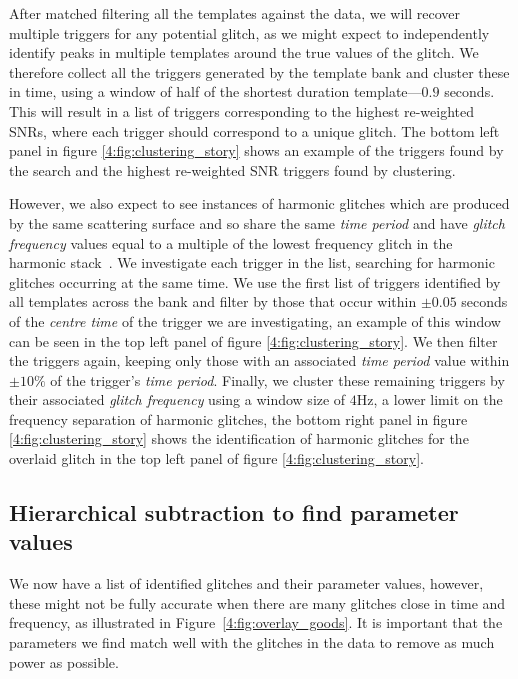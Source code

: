 After matched filtering all the templates against the data, we will recover multiple triggers for any potential \scladj glitch, as we might expect to independently identify peaks in multiple templates around the true values of the glitch. We therefore collect all the triggers generated by the template bank and cluster these in time, using a window of half of the shortest duration template---$0.9$ seconds. This will result in a list of triggers corresponding to the highest re-weighted SNRs, where each trigger should correspond to a unique \scladj glitch. The bottom left panel in figure \ref{4:fig:clustering_story} shows an example of the triggers found by the search and the highest re-weighted SNR triggers found by clustering.

However, we also expect to see instances of harmonic glitches which are produced by the same scattering surface and so share the same \emph{time period} and have \emph{glitch frequency} values equal to a multiple of the lowest frequency glitch in the harmonic stack~\cite{TAccadia:2010}. We investigate each trigger in the list, searching for harmonic glitches occurring at the same time. We use the first list of triggers identified by all templates across the bank and filter by those that occur within $\pm0.05$ seconds of the \emph{centre time} of the trigger we are investigating, an example of this window can be seen in the top left panel of figure \ref{4:fig:clustering_story}. We then filter the triggers again, keeping only those with an associated \emph{time period} value within $\pm 10 \%$ of the trigger's \emph{time period}. Finally, we cluster these remaining triggers by their associated \emph{glitch frequency} using a window size of $4$Hz, a lower limit on the frequency separation of harmonic glitches, the bottom right panel in figure \ref{4:fig:clustering_story} shows the identification of harmonic glitches for the overlaid \scladj glitch in the top left panel of figure \ref{4:fig:clustering_story}.

\subsection{Hierarchical subtraction to find parameter values}

We now have a list of identified \scladj glitches and their parameter values, however, these might not be fully accurate when there are many glitches close in time and frequency, as illustrated in Figure~\ref{4:fig:overlay_goods}. It is important that the parameters we find match well with the glitches in the data to remove as much power as possible.


